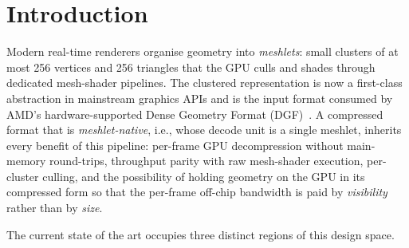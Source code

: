 \documentclass[pdflatex,sn-vancouver-num]{sn-jnl}%
\theoremstyle{thmstyleone}%
\theoremstyle{thmstyletwo}%
\theoremstyle{thmstylethree}%
\begin{document}

\maketitle

\section{Introduction}\label{sec:intro}

Modern real-time renderers organise geometry into \emph{meshlets}: small clusters of at most 256 vertices and 256 triangles that the GPU culls and shades through dedicated mesh-shader pipelines. The clustered representation is now a first-class abstraction in mainstream graphics APIs and is the input format consumed by AMD's hardware-supported Dense Geometry Format (DGF)~\cite{ref01_amd_dgf_hpg2024}. A compressed format that is \emph{meshlet-native}, i.e., whose decode unit is a single meshlet, inherits every benefit of this pipeline: per-frame GPU decompression without main-memory round-trips, throughput parity with raw mesh-shader execution, per-cluster culling, and the possibility of holding geometry on the GPU in its compressed form so that the per-frame off-chip bandwidth is paid by \emph{visibility} rather than by \emph{size}.

The current state of the art occupies three distinct regions of this design space.
\end{document}
